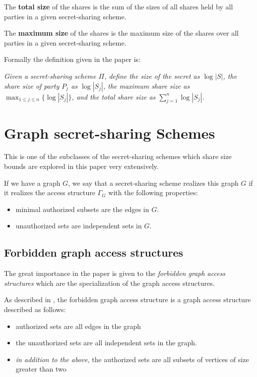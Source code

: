 The \textbf{total size} of the shares is the sum of the sizes of all shares held by all parties in a given secret-sharing scheme.

The \textbf{maximum size} of the shares is the maximum size of the shares over all parties in a given secret-sharing scheme.

Formally the definition given in the paper is:

\emph{Given a secret-sharing scheme $\Pi$,
define the \emph{size} of the secret as $\log |S|$,
the \emph{share size} of party $P_j$ as $\log |S_j|$,
the \emph{maximum share size} as $\max_{1\le j \le n} \{\log |S_j| \}$,
and the \emph{total share size} as $\sum_{j=1}^{n} \log |S_j|$.
}

\section{Graph secret-sharing Schemes}

This is one of the subclasses of the secret-sharing schemes which share size bounds are explored in this paper very extensively.

If we have a graph $G$, we say that a secret-sharing scheme realizes this graph $G$ if it realizes the access structure $\Gamma_G$ with the following properties:

\begin{itemize}
    \item minimal authorized subsets are the edges in $G$.
    \item unauthorized sets are independent sets in $G$.
\end{itemize}

\subsection{Forbidden graph access structures}

The great importance in the paper is given to the \textit{forbidden graph access structures} which are the specialization of the graph access structures.

As described in \cite{forbiddenGraphAccessStructures}, the forbidden graph access structure is a graph access structure described as follows:

\begin{itemize}
    \item authorized sets are all edges in the graph
    \item the unauthorized sets are all independent sets in the graph.
    \item \textit{in addition to the above}, the authorized sets are all subsets of vertices of size greater than two
\end{itemize}

